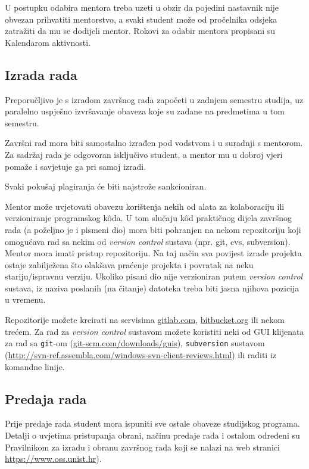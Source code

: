 U postupku odabira mentora treba uzeti u obzir da pojedini nastavnik nije obvezan prihvatiti mentorstvo, a svaki student može od pročelnika odsjeka zatražiti da mu se dodijeli mentor. Rokovi za odabir mentora propisani su Kalendarom aktivnosti.

\subsection{Izrada rada}
Preporučljivo je s izradom završnog rada započeti u zadnjem semestru studija, uz paralelno uspješno izvršavanje obaveza koje su zadane na predmetima u tom semestru.

Završni rad mora biti samostalno izrađen pod vodstvom i u suradnji s mentorom. Za sadržaj rada je odgovoran isključivo student, a mentor mu u dobroj vjeri pomaže i savjetuje ga pri samoj izradi.

Svaki pokušaj plagiranja će biti najstrože sankcioniran.

Mentor može uvjetovati obavezu korištenja nekih od alata za kolaboraciju ili verzioniranje programskog k\^oda. U tom slučaju k\^od praktičnog dijela završnog rada (a poželjno je i pismeni dio) mora biti pohranjen na nekom repozitoriju koji omogućava rad sa nekim od \textit{version control} sustava (npr. git, cvs, subversion). Mentor mora imati pristup repozitoriju. Na taj način sva povijest izrade projekta ostaje zabilježena što olakšava praćenje projekta i povratak na neku stariju/ispravnu verziju. Ukoliko pisani dio nije verzioniran putem \textit{version control} sustava, iz naziva poslanih (na čitanje) datoteka treba biti jasna njihova pozicija u vremenu.  
 
Repozitorije možete kreirati na servisima \url{gitlab.com}, \url{bitbucket.org} ili nekom trećem. Za rad za \textit{version control} sustavom možete koristiti neki od GUI klijenata za rad sa 
 \texttt{git}-om (\url{git-scm.com/downloads/guis}), \texttt{subversion} sustavom (\url{http://svn-ref.assembla.com/windows-svn-client-reviews.html}) ili raditi iz komandne linije.
 
\subsection{Predaja rada}
Prije predaje rada student mora ispuniti sve ostale obaveze studijskog programa. Detalji o uvjetima pristupanja obrani, načinu predaje rada i ostalom određeni su Pravilnikom za izradu i obranu završnog rada koji se nalazi na web stranici \url{https://www.oss.unist.hr}).

